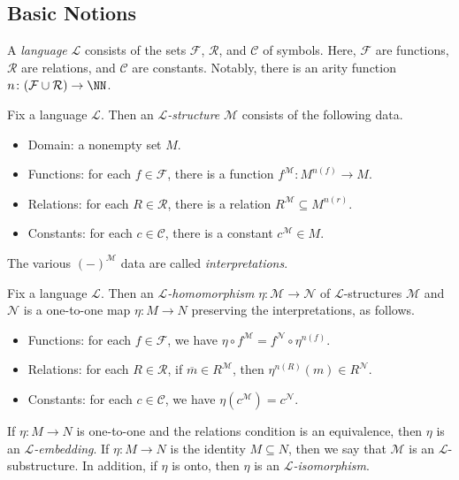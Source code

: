 \documentclass{article}
\begin{document}
\subsection{Basic Notions}
\begin{definition}[language]
	A \textit{language} $\mathcal L$ consists of the sets $\mathcal F$, $\mathcal R$, and $\mathcal C$ of symbols. Here, $\mathcal F$ are functions, $\mathcal R$ are relations, and $\mathcal C$ are constants. Notably, there is an arity function $n\colon(\mathcal F\cup\mathcal R)\to\NN$.
\end{definition}
\begin{definition}[structure]
	Fix a language $\mathcal L$. Then an \textit{$\mathcal L$-structure} $\mathcal M$ consists of the following data.
	\begin{itemize}
		\item Domain: a nonempty set $M$.
		\item Functions: for each $f\in\mathcal F$, there is a function $f^{\mathcal M}\colon M^{n(f)}\to M$.
		\item Relations: for each $R\in\mathcal R$, there is a relation $R^\mathcal M\subseteq M^{n(r)}$.
		\item Constants: for each $c\in\mathcal C$, there is a constant $c^\mathcal M\in M$.
	\end{itemize}
	The various $(-)^\mathcal M$ data are called \textit{interpretations}.
\end{definition}
\begin{defihelper}   
	Fix a language $\mathcal L$. Then an \textit{$\mathcal L$-homomorphism} $\eta\colon\mathcal M\to\mathcal N$ of $\mathcal L$-structures $\mathcal M$ and $\mathcal N$ is a one-to-one map $\eta\colon M\to N$ preserving the interpretations, as follows.
	\begin{itemize}
		\item Functions: for each $f\in\mathcal F$, we have $\eta\circ f^\mathcal M=f^\mathcal N\circ\eta^{n(f)}$.
		\item Relations: for each $R\in\mathcal R$, if $\overline m\in R^\mathcal M$, then $\eta^{n(R)}(m)\in R^\mathcal N$.
		\item Constants: for each $c\in\mathcal C$, we have $\eta\left(c^\mathcal M\right)=c^\mathcal N$.
	\end{itemize}
	If $\eta\colon M\to N$ is one-to-one and the relations condition is an equivalence, then $\eta$ is an \textit{$\mathcal L$-embedding}. If $\eta\colon M\to N$ is the identity $M\subseteq N$, then we say that $\mathcal M$ is an $\mathcal L$-substructure. In addition, if $\eta$ is onto, then $\eta$ is an \textit{$\mathcal L$-isomorphism}.
\end{defihelper}
\end{document}
